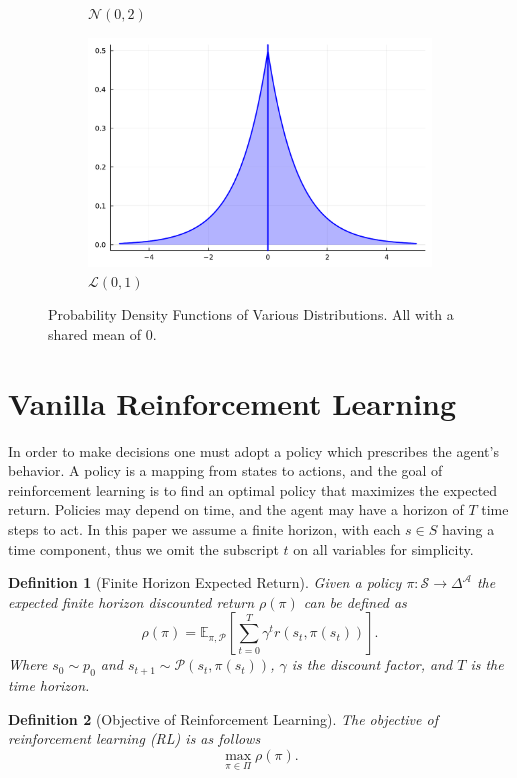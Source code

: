 \documentclass[10pt]{article}
\newtheorem{definition}{Definition}
\theoremstyle{plain}
\theoremstyle{remark}
\begin{document}
\begin{figure}[ht!]
\begin{subfigure}[t]{0.5\textwidth}
                \caption{$\mathcal{N}(0,2)$}
                \label{fig:normal_wide}
        \end{subfigure}
        \begin{subfigure}[t]{1.0\textwidth}
                \centering
                \includegraphics[width=0.4\linewidth]{julia_figures/laplace.pdf}

                \caption{$\mathcal{L}(0,1)$}
                \label{fig:laplace}
        \end{subfigure}
        \caption{Probability Density Functions of Various Distributions. All with a shared mean of 0.}
        \label{fig:pdfs}
\end{figure}

\section{Vanilla Reinforcement Learning}

In order to make decisions one must adopt a policy which prescribes the agent's behavior.
A policy is a mapping from states to actions, and the goal of reinforcement learning is to find an optimal policy that maximizes the expected return.
Policies may depend on time, and the agent may have a horizon of $T$ time steps to act. 
In this paper we assume a finite horizon, with each $s \in S$ having a time component, thus we omit the subscript $t$ on all variables for simplicity.

\begin{definition}[Finite Horizon Expected Return]
        Given a policy $\pi : \mathcal{S} \to \Delta^\mathcal{A}$ the expected finite horizon discounted return $\rho(\pi)$ can be defined as
        $$\rho(\pi) = \mathbb{E}_{\pi, \mathcal{P}} \left[ \sum_{t=0}^{T} \gamma^t r(s_t, \pi(s_t)) \right].$$
        Where $s_0 \sim p_0$ and $s_{t+1} \sim \mathcal{P}(s_t, \pi(s_t))$, $\gamma$ is the discount factor, and $T$ is the time horizon.
\end{definition}

\begin{definition}[Objective of Reinforcement Learning]
        \label{def:rl_obj}
        The objective of reinforcement learning (RL) is as follows
        $$\max_{\pi \in \Pi} \rho(\pi).$$
\end{definition}
\end{document}
